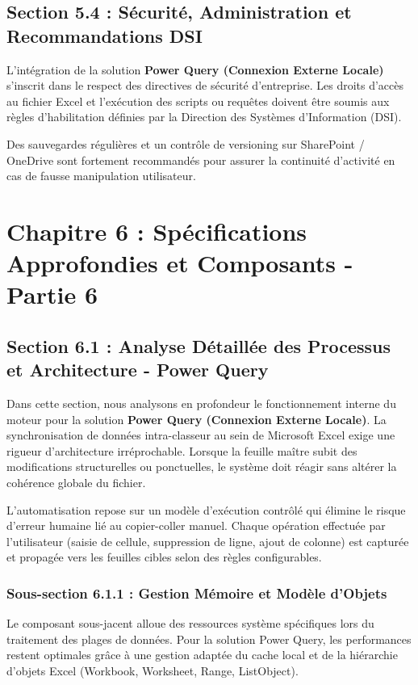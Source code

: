 \documentclass[12pt,a4paper]{report}
\begin{document}
\section{Section 5.4 : Sécurité, Administration et Recommandations DSI}
L'intégration de la solution \textbf{Power Query (Connexion Externe Locale)} s'inscrit dans le respect des directives de sécurité d'entreprise. Les droits d'accès au fichier Excel et l'exécution des scripts ou requêtes doivent être soumis aux règles d'habilitation définies par la Direction des Systèmes d'Information (DSI).

Des sauvegardes régulières et un contrôle de versioning sur SharePoint / OneDrive sont fortement recommandés pour assurer la continuité d'activité en cas de fausse manipulation utilisateur.


\chapter{Chapitre 6 : Spécifications Approfondies et Composants - Partie 6}

\section{Section 6.1 : Analyse Détaillée des Processus et Architecture - Power Query}
Dans cette section, nous analysons en profondeur le fonctionnement interne du moteur pour la solution \textbf{Power Query (Connexion Externe Locale)}. La synchronisation de données intra-classeur au sein de Microsoft Excel exige une rigueur d'architecture irréprochable. Lorsque la feuille maître subit des modifications structurelles ou ponctuelles, le système doit réagir sans altérer la cohérence globale du fichier.

L'automatisation repose sur un modèle d'exécution contrôlé qui élimine le risque d'erreur humaine lié au copier-coller manuel. Chaque opération effectuée par l'utilisateur (saisie de cellule, suppression de ligne, ajout de colonne) est capturée et propagée vers les feuilles cibles selon des règles configurables.


\subsection{Sous-section 6.1.1 : Gestion Mémoire et Modèle d'Objets}
Le composant sous-jacent alloue des ressources système spécifiques lors du traitement des plages de données. Pour la solution Power Query, les performances restent optimales grâce à une gestion adaptée du cache local et de la hiérarchie d'objets Excel (Workbook, Worksheet, Range, ListObject).
\end{document}
